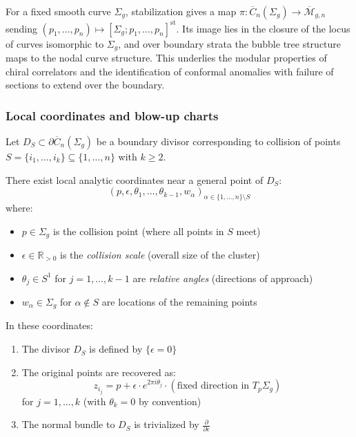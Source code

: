 \begin{remark}\label{rem:moduli-stable-curves}
For a fixed smooth curve $\Sigma_g$, stabilization gives a map $\pi: \overline{C}_n(\Sigma_g) \to \overline{\mathcal{M}}_{g,n}$ sending $(p_1, \ldots, p_n) \mapsto [\Sigma_g; p_1, \ldots, p_n]^{\mathrm{st}}$.  Its image lies in the closure of the locus of curves isomorphic to $\Sigma_g$, and over boundary strata the bubble tree structure maps to the nodal curve structure.  This underlies the modular properties of chiral correlators and the identification of conformal anomalies with failure of sections to extend over the boundary.
\end{remark}

\subsubsection{Local coordinates and blow-up charts}

\begin{theorem}\label{thm:local-coords-boundary}
Let $D_S \subset \partial\overline{C}_n(\Sigma_g)$ be a boundary divisor corresponding to collision of points $S = \{i_1, \ldots, i_k\} \subseteq \{1,\ldots,n\}$ with $k \geq 2$.

There exist local analytic coordinates near a general point of $D_S$:
\[(p, \epsilon, \theta_1, \ldots, \theta_{k-1}, w_{\alpha})_{\alpha \in \{1,\ldots,n\}\setminus S}\]
where:
\begin{itemize}
\item $p \in \Sigma_g$ is the collision point (where all points in $S$ meet)
\item $\epsilon \in \mathbb{R}_{>0}$ is the \emph{collision scale} (overall size of the cluster)
\item $\theta_j \in S^1$ for $j=1,\ldots,k-1$ are \emph{relative angles} (directions of approach)
\item $w_{\alpha} \in \Sigma_g$ for $\alpha \notin S$ are locations of the remaining points
\end{itemize}

In these coordinates:
\begin{enumerate}
\item The divisor $D_S$ is defined by $\{\epsilon = 0\}$
\item The original points are recovered as:
\[z_{i_j} = p + \epsilon \cdot e^{2\pi i \theta_j} \cdot (\text{fixed direction in } T_p\Sigma_g)\]
for $j = 1, \ldots, k$ (with $\theta_k = 0$ by convention)
\item The normal bundle to $D_S$ is trivialized by $\frac{\partial}{\partial \epsilon}$
\end{enumerate}
\end{theorem}

